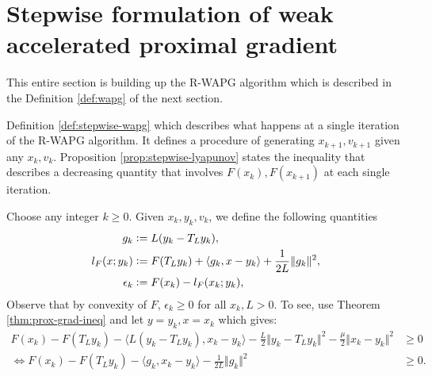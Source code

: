 \documentclass[12pt]{article}
\begin{document}
\section{Stepwise formulation of weak accelerated proximal gradient}
    This entire section is building up the R-WAPG algorithm which is described in the Definition \ref{def:wapg} of the next section. 
    \par 
    Definition \ref{def:stepwise-wapg} which describes what happens at a single iteration of the R-WAPG algorithm. 
    It defines a procedure of generating $x_{k + 1}, v_{k + 1}$ given any $x_k, v_k$. 
    Proposition \ref{prop:stepwise-lyapunov} states the inequality that describes a decreasing quantity that involves $F(x_k), F(x_{k + 1})$ at each single iteration. 
    \begin{assumption}
        Choose any integer $k\ge 0$. 
        Given $x_k, y_k, v_k$, we define the following quantities
        \begin{align}
            g_k &\vcentcolon= L(y_k - T_L y_k), 
            \label{eqn:grad-map}
            \\
            l_F(x; y_k) &\vcentcolon= F(T_Ly_k) + \langle g_k, x - y_k\rangle + \frac{1}{2L}\Vert g_k\Vert^2, 
            \label{eqn:lower-linearization}
            \\
            \epsilon_{k} &\vcentcolon= F(x_k) - l_F(x_k; y_k), 
            \label{eqn:regret}
        \end{align}
        Observe that by convexity of $F$, $\epsilon_k \ge 0$ for all $x_k, L > 0$. 
        To see, use Theorem \ref{thm:prox-grad-ineq} and let $y = y_k, x = x_k$ which gives: 
        \begin{align*}
            F(x_k) - F(T_Ly_k)
            - \langle L(y_k - T_Ly_k),x_k - y_k \rangle
            - \frac{L}{2}\Vert y_k - T_Ly_k\Vert^2
            - \frac{\mu}{2}\Vert x_k - y_k\Vert^2
            &\ge 0
            \\
            \iff 
            F(x_k) - F(T_Ly_k)
            - \langle g_k,x_k - y_k \rangle
            - \frac{1}{2L}\Vert g_k\Vert^2
            &\ge 0. 
        \end{align*}
    \end{assumption}
    
\end{document}
